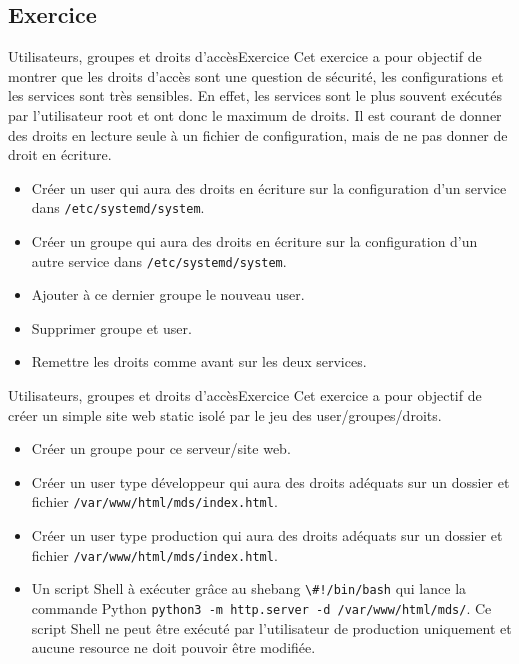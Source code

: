\documentclass{beamer}
\begin{document}
    \subsection{Exercice}\label{subsec:user-group-rights-exercice}
    \begin{frame}{Utilisateurs, groupes et droits d'accès}{Exercice \execcounterdispinc}
        Cet exercice a pour objectif de montrer que les droits d'accès sont une question de sécurité, les configurations et les services sont très sensibles.
        En effet, les services sont le plus souvent exécutés par l'utilisateur root et ont donc le maximum de droits.
        \bigbreak
        Il est courant de donner des droits en lecture seule à un fichier de configuration, mais de ne pas donner de droit en écriture.
        \begin{itemize}
            \item Créer un user qui aura des droits en écriture sur la configuration d'un service dans \lstinline{/etc/systemd/system}.
            \item Créer un groupe qui aura des droits en écriture sur la configuration d'un autre service dans \lstinline{/etc/systemd/system}.
            \item Ajouter à ce dernier groupe le nouveau user.
            \item Supprimer groupe et user.
            \item Remettre les droits comme avant sur les deux services.
        \end{itemize}
    \end{frame}

    \begin{frame}{Utilisateurs, groupes et droits d'accès}{Exercice \execcounterdispinc}
        Cet exercice a pour objectif de créer un simple site web static isolé par le jeu des user/groupes/droits.
        \begin{itemize}
            \item Créer un groupe pour ce serveur/site web.
            \item Créer un user type développeur qui aura des droits adéquats sur un dossier et fichier \lstinline{/var/www/html/mds/index.html}.
            \item Créer un user type production qui aura des droits adéquats sur un dossier et fichier \lstinline{/var/www/html/mds/index.html}.
            \item Un script Shell à exécuter grâce au shebang \lstinline{\#!/bin/bash} qui lance la commande Python \lstinline{python3 -m http.server -d /var/www/html/mds/}.
            Ce script Shell ne peut être exécuté par l'utilisateur de production uniquement et aucune resource ne doit pouvoir être modifiée.
        \end{itemize}
    \end{frame}
\end{document}
